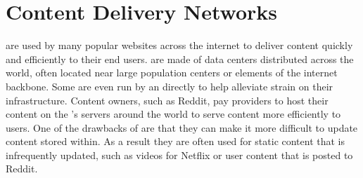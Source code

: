 \section{Content Delivery Networks}\label{sec:background_cdns}
\CDNs are used by many popular websites across the internet to deliver content quickly and efficiently to their end users. \CDNs are made of data centers distributed across the world, often located near large population centers or elements of the internet backbone. Some \cdns are even run by an \isp directly to help alleviate strain on their infrastructure. Content owners, such as Reddit, pay \cdn providers to host their content on the \cdn's servers around the world to serve content more efficiently to users. One of the drawbacks of \cdns are that they can make it more difficult to update content stored within. As a result they are often used for static content that is infrequently updated, such as videos for Netflix or user content that is posted to Reddit.